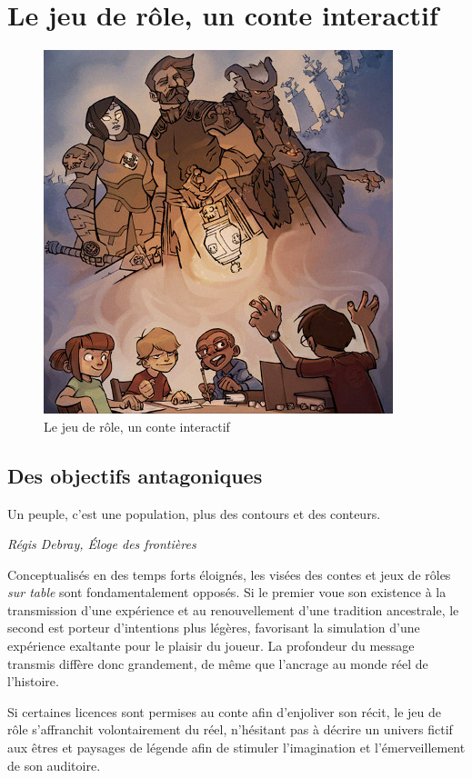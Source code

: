 \section{Le jeu de rôle, un conte interactif}

\begin{figure}[h!]
    \centering
    \includegraphics[width=0.7\linewidth]{img/rpg_tabletop2.jpg}
    \caption{Le jeu de rôle, un conte interactif}
\end{figure}


\subsection{Des objectifs antagoniques}

\begin{shadequote}
Un peuple, c'est une population, plus des contours et des conteurs. \par\emph{Régis Debray, Éloge des frontières}
\end{shadequote}

Conceptualisés en des temps forts éloignés, les visées des contes et jeux de rôles \textit{sur table} sont fondamentalement opposés. Si le premier voue son existence à la transmission d'une expérience et au renouvellement d'une tradition ancestrale, le second est porteur d'intentions plus légères, favorisant la simulation d'une expérience exaltante pour le plaisir du joueur. La profondeur du message transmis diffère donc grandement, de même que l'ancrage au monde réel de l'histoire.

Si certaines licences sont permises au conte afin d'enjoliver son récit, le jeu de rôle s'affranchit volontairement du réel, n'hésitant pas à décrire un univers fictif aux êtres et paysages de légende afin de stimuler l'imagination et l'émerveillement de son auditoire.

